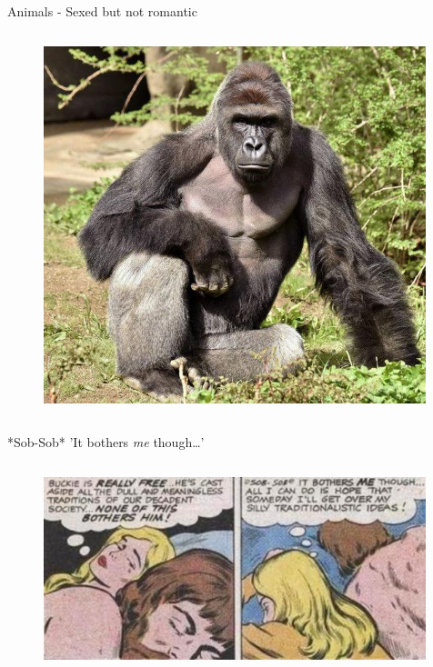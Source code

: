 \documentclass[xcolor=dvipsnames]{beamer}
\begin{document}
\begin{frame}[fragile]{Animals - Sexed but not romantic}
  \begin{columns}[T] %
    \begin{column}{0.65\textwidth}
      \begin{figure}[H]
        \centering
        \includegraphics[width=0.99\textwidth]{gorilla}
      \end{figure}
    \end{column}%
  \end{columns}
\end{frame}


\begin{frame}[fragile]{*Sob-Sob* 'It bothers \emph{me} though\ldots'}
  \begin{columns}[T] %
    \begin{column}{0.99\textwidth}
      \begin{figure}[H]
        \centering
        \includegraphics[width=0.99\textwidth]{buckie}
      \end{figure}
    \end{column}%
  \end{columns}
\end{frame}
\end{document}
